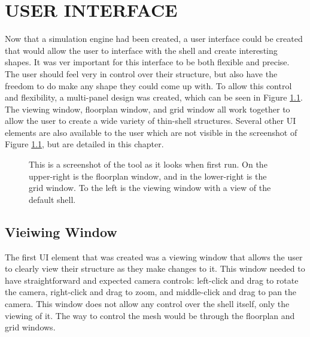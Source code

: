 \documentclass{thesis}
\begin{document}
\chapter{USER INTERFACE}
Now that a simulation engine had been created, a user interface could be created that would allow the user to interface with the
shell and create interesting shapes.  It was ver important for this interface to be both flexible and precise.  The user should
feel very in control over their structure, but also have the freedom to do make any shape they could come up with.  To allow this
control and flexibility, a multi-panel design was created, which can be seen in Figure \ref{fig:basic}.  The viewing window,
floorplan window, and grid window all work together to allow the user to create a wide variety of thin-shell structures.  Several
other UI elements are also available to the user which are not visible in the screenshot of Figure \ref{fig:basic}, but are
detailed in this chapter.

\begin{figure}
\caption[The tool]{This is a screenshot of the tool as it looks when first run.  On the upper-right is the floorplan window, and
in the lower-right is the grid window.  To the left is the viewing window with a view of the default shell.}
\label{fig:basic}
\end{figure}

\section{Vieiwing Window}
The first UI element that was created was a viewing window that allows the user to clearly view their structure as they make changes
to it. This window needed to have straightforward and expected camera controls: left-click and drag to rotate the camera, right-click and
drag to zoom, and middle-click and drag to pan the camera.  This window does not allow any control over the shell itself, only the viewing
of it.  The way to control the mesh would be through the floorplan and grid windows.
\end{document}
